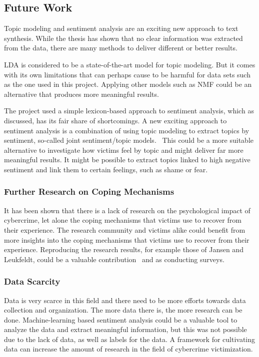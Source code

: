 \subsection{Future Work}

Topic modeling and sentiment analysis are an exciting new approach to text synthesis. While the thesis has shown that no clear information was extracted from the data, there are many methods to deliver different or better results.

LDA is considered to be a state-of-the-art model for topic modeling. But it comes with its own limitations that can perhaps cause to be harmful for data sets such as the one used in this project. Applying other models such as NMF could be an alternative that produces more meaningful results.

The project used a simple lexicon-based approach to sentiment analysis, which as discussed, has its fair share of shortcomings. A new exciting approach to sentiment analysis is a combination of using topic modeling to extract topics by sentiment, so-called joint sentiment/topic models.~\cite{lin2009joint} This could be a more suitable alternative to investigate how victims feel by topic and might deliver far more meaningful results. It might be possible to extract topics linked to high negative sentiment and link them to certain feelings, such as shame or fear.

\subsubsection*{Further Research on Coping Mechanisms}

It has been shown that there is a lack of research on the psychological impact of cybercrime, let alone the coping mechanisms that victims use to recover from their experience. The research community and victims alike could benefit from more insights into the coping mechanisms that victims use to recover from their experience. Reproducing the research results, for example those of Jansen and Leukfeldt, could be a valuable contribution~\cite{jansen2018coping} and as conducting surveys.

\subsubsection*{Data Scarcity}

Data is very scarce in this field and there need to be more efforts towards data collection and organization. The more data there is, the more research can be done. Machine-learning based sentiment analysis could be a valuable tool to analyze the data and extract meaningful information, but this was not possible due to the lack of data, as well as labels for the data. A framework for cultivating data can increase the amount of research in the field of cybercrime victimization.


